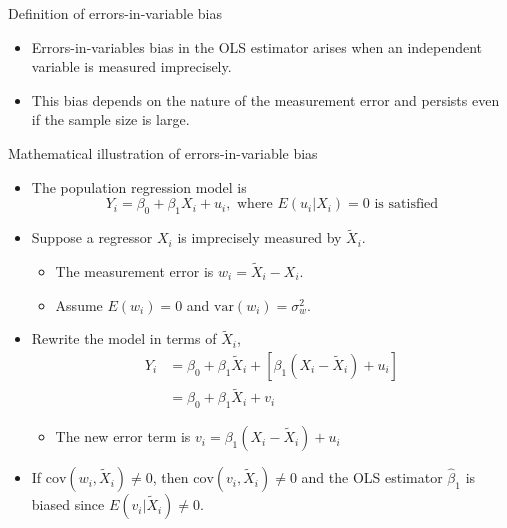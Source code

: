 \documentclass[presentation,10pt]{beamer}
\newcommand{\var}{\mathrm{var}}
\newcommand{\cov}{\mathrm{cov}}
\begin{document}
\begin{frame}[label={sec:orgf411da2}]{Definition of errors-in-variable bias}
\begin{itemize}
\item \alert{Errors-in-variables bias} in the OLS estimator arises when an
independent variable is measured imprecisely.
\end{itemize}

\vspace{0.3cm}

\begin{itemize}
\item This bias depends on the nature of the measurement error and persists
even if the sample size is large.
\end{itemize}
\end{frame}

\begin{frame}[label={sec:orgf1bf6c7}]{Mathematical illustration of errors-in-variable bias}
\begin{itemize}
\item The population regression model is 
\[ Y_i = \beta_0 + \beta_1 X_i + u_i, \text{ where } E(u_i | X_i) =
  0 \text{ is satisfied}  \]

\item Suppose a regressor \(X_i\) is imprecisely measured by
\(\tilde{X}_i\).
\begin{itemize}
\item The measurement error is \(w_i = \tilde{X}_i - X_i\).
\item Assume \(E(w_i) = 0\) and \(\var(w_i) = \sigma^2_w\).
\end{itemize}

\item Rewrite the model in terms of \(\tilde{X}_i\),
\begin{equation}
\begin{split}
Y_i &= \beta_0 + \beta_1 \tilde{X}_i + [\beta_1 (X_i - \tilde{X}_i) + u_i] \\
    &= \beta_0 + \beta_1 \tilde{X}_i + v_i \label{eq:err-in-var}
\end{split}
\end{equation}
\begin{itemize}
\item The new error term is \(v_i = \beta_1(X_i - \tilde{X}_i) + u_i\)
\end{itemize}

\item If \(\cov(w_i, \tilde{X}_i) \neq 0\), then \(\cov(v_i, \tilde{X}_i)
  \neq 0\) and the OLS estimator \(\hat{\beta}_1\) is biased since
\(E(v_i | \tilde{X}_i) \neq 0\).
\end{itemize}
\end{frame}
\end{document}
